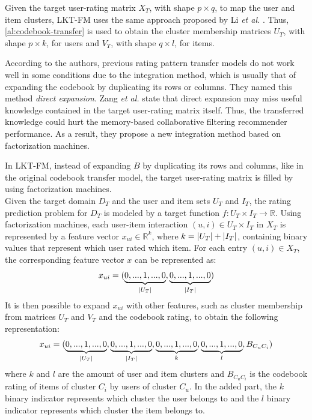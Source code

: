 Given the target user-rating matrix $X_T$, with shape $p \times q$, to map the user and item clusters, LKT-FM uses the same approach proposed by Li \textit{et al.} \cite{10.5555/1661445.1661773}. Thus, \autoref{al:codebook-transfer} is used to obtain the cluster membership matrices $U_T$, with shape $p \times k$, for users and $V_T$, with shape $q \times l$, for items.\par
According to the authors, previous rating pattern transfer models do not work well in some conditions due to the integration method, which is usually that of expanding the codebook by duplicating its rows or columns. They named this method \textit{direct expansion}. Zang \textit{et al.} state that direct expansion may miss useful knowledge contained in the target user-rating matrix itself. Thus, the transferred knowledge could hurt the memory-based collaborative filtering recommender performance. As a result, they propose a new integration method based on factorization machines.\par
In LKT-FM, instead of expanding $B$ by duplicating its rows and columns, like in the original codebook transfer model, the target user-rating matrix is filled by using factorization machines.\\
Given the target domain $D_T$ and the user and item sets $U_T$ and $I_T$, the rating prediction problem for $D_T$ is modeled by a target function $f: U_T \times I_T \rightarrow \mathbb{R}$. Using factorization machines, each user-item interaction $(u,i) \in U_T \times I_T$ in $X_T$ is represented by a feature vector $x_{ui} \in \mathbb{R}^k$, where $k = \left\lvert U_T\right\rvert + \left\lvert I_T\right\rvert$, containing binary values that represent which user rated which item. For each entry $(u,i) \in X_T$, the corresponding feature vector $x$ can be represented as:
\begin{equation}
x_{ui} = (\underbrace{0,...,1,...,0}_{\left\lvert U_T\right\rvert},\underbrace{0,...,1,...,0}_{\left\lvert I_T\right\rvert})
\end{equation}
It is then possible to expand $x_{ui}$ with other features, such as cluster membership from matrices $U_T$ and $V_T$ and the codebook rating, to obtain the following representation:
\begin{equation}
x_{ui} = (\underbrace{0,...,1,...,0}_{\left\lvert U_T\right\rvert},\underbrace{0,...,1,...,0}_{\left\lvert I_T\right\rvert},\underbrace{0,...,1,...,0}_{k},\underbrace{0,...,1,...,0}_{l},B_{C_uC_i})
\end{equation}
where $k$ and $l$ are the amount of user and item clusters and $B_{C_uC_i}$ is the codebook rating of items of cluster $C_i$ by users of cluster $C_u$. In the added part, the $k$ binary indicator represents which cluster the user belongs to and the $l$ binary indicator represents which cluster the item belongs to.\\
